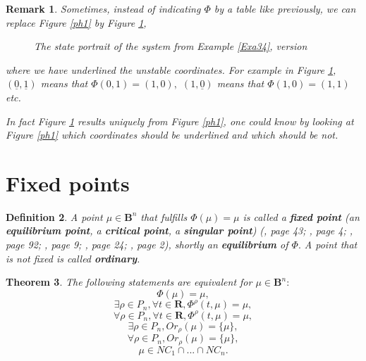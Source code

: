 \documentclass[12pt]{article}\usepackage{amsmath}
\newtheorem{theorem}{Theorem}
\newtheorem{definition}[theorem]{Definition}
\newtheorem{remark}[theorem]{Remark}
\begin{document}
\begin{remark}
Sometimes, instead of indicating $\Phi$ by a table like previously, we can
replace Figure \ref{ph1} by Figure \ref{ph2},\begin{figure}
[ptb]
\begin{center}
\caption{The state portrait of the system from Example \ref{Exa34}, version}\label{ph2}\end{center}
\end{figure}
where we have underlined the unstable coordinates. For example in Figure
\ref{ph2}, $(\underline{0},\underline{1})$ means that $\Phi(0,1)=(1,0),$
$(1,\underline{0})$ means that $\Phi(1,0)=(1,1)$ etc.

In fact Figure \ref{ph2} results uniquely from Figure \ref{ph1}, one could
know by looking at Figure \ref{ph1} which coordinates should be underlined and
which should be not.
\end{remark}

\section{Fixed points}

\begin{definition}
A point $\mu\in\mathbf{B}^{n}$ that fulfills $\Phi(\mu)=\mu$ is called a
\textbf{fixed point} (an \textbf{equilibrium point}, a \textbf{critical
point}, a \textbf{singular point}) (\cite{bib4}, page 43; \cite{bib3}, page 4;
\cite{bib6}, page 92; \cite{bib1}, page 9; \cite{bib2}, page 24; \cite{bib5},
page 2), shortly an \textbf{equilibrium} of $\Phi.$ A point that is not fixed
is called \textbf{ordinary}.
\end{definition}

\begin{theorem}
\label{The38}The following statements are equivalent for $\mu\in\mathbf{B}^{n}:$\begin{equation}
\Phi(\mu)=\mu, \label{equ1}\end{equation}\begin{equation}
\exists\rho\in P_{n},\forall t\in\mathbf{R},\Phi^{\rho}(t,\mu)=\mu,
\label{equ2}\end{equation}\begin{equation}
\forall\rho\in P_{n},\forall t\in\mathbf{R},\Phi^{\rho}(t,\mu)=\mu,
\label{equ2_}\end{equation}\begin{equation}
\exists\rho\in P_{n},Or_{\rho}(\mu)=\{\mu\}, \label{equ3}\end{equation}\begin{equation}
\forall\rho\in P_{n},Or_{\rho}(\mu)=\{\mu\}, \label{equ3_}\end{equation}\begin{equation}
\mu\in NC_{1}\cap...\cap NC_{n}. \label{equ3__}\end{equation}

\end{theorem}
\end{document}
